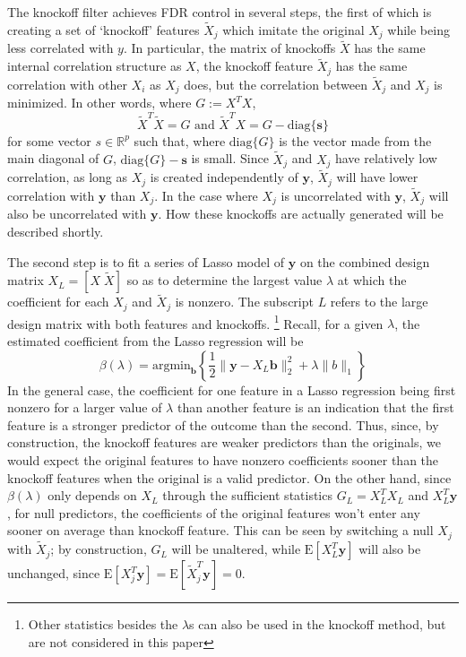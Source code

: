 \documentclass[11pt]{article}
\newcommand{\R}{\mathbb{R}}
\newcommand{\E}{\mathrm{E}}
\newcommand{\diag}[1]{\mathrm{diag}\{#1\}}
\theoremstyle{definition}
\begin{document}
    The knockoff filter achieves FDR control in several steps, the first of which is creating a set of `knockoff' features $\tilde X_j$ which imitate the original $X_j$ while being less correlated with $y$. In particular, the matrix of knockoffs $\tilde X$ has the same internal correlation structure as $X$, the knockoff feature $\tilde X_j$ has the same correlation with other $X_i$ as $X_j$ does, but the correlation between $\tilde X_j$ and $X_j$ is minimized. In other words, where $ G := X^TX$, 
    \[ \tilde X^T\tilde X=G \textrm{ and } \tilde X^T X = G - \diag{\mathbf s}\]
    for some vector $s\in \R^p$ such that, where $\diag{G}$ is the vector made from the main diagonal of $G$, $\diag{G} - \mathbf s$ is small. Since $\tilde X_j$ and $X_j$ have relatively low correlation, as long as $X_j$ is created independently of $\mathbf y$, $\tilde X_j$ will have lower correlation with $\mathbf y$ than $X_j$. In the case where $X_j$ is uncorrelated with $\mathbf y$, $\tilde X_j$ will also be uncorrelated with $\mathbf y$. How these knockoffs are actually generated will be described shortly.\par
    The second step is to fit a series of Lasso model of $\mathbf y$ on the combined design matrix $X_L=[X \; \tilde X]$ so as to determine the largest value $\lambda$ at which the coefficient for each $X_j$ and $\tilde X_j$ is nonzero. The subscript $L$ refers to the large design matrix with both features and knockoffs. \footnote{Other statistics besides the $\lambda$s can also be used in the knockoff method, but are not considered in this paper} Recall, for a given $\lambda$, the estimated coefficient from the Lasso regression will be 
    \[ \beta(\lambda) = \textrm{argmin}_\mathbf b \left\{\frac{1}{2}\|\mathbf y - X_L\mathbf b\|^2_2 + \lambda\|b\|_1 \right\}\]
    In the general case, the coefficient for one feature in a Lasso regression being first nonzero for a larger value of $\lambda$ than another feature is an indication that the first feature is a stronger predictor of the outcome than the second. Thus, since, by construction, the knockoff features are weaker predictors than the originals, we would expect the original features to have nonzero coefficients sooner than the knockoff features when the original is a valid predictor. On the other hand, since $\beta(\lambda)$ only depends on $X_L$ through the sufficient statistics $G_L=X_L^TX_L$ and $X_L^T\mathbf y$, for null predictors, the coefficients of the original features won't enter any sooner on average than knockoff feature. This can be seen by switching a null $X_j$ with $\tilde X_j$; by construction, $G_L$ will be unaltered, while $\E\left[X_L^T\mathbf y\right]$ will also be unchanged, since $\E[X_j^T\mathbf y]=\E[\tilde X_j^T\mathbf y]=0$. \par
\end{document}
